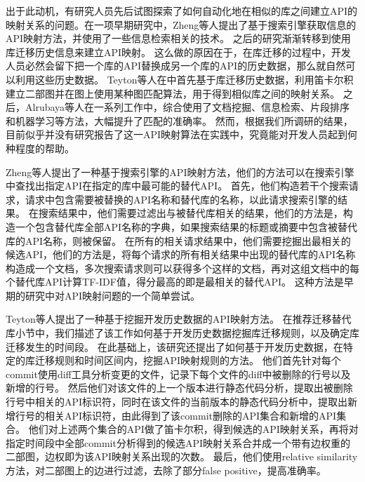 \documentclass[UTF8]{ctexart}
\begin{document}

出于此动机，有研究人员先后试图探索了如何自动化地在相似的库之间建立API的映射关系的问题\cite{2011FSE-Zheng-Cross, 2013WCRE-Teyton-Automatic, 2013ICSE-Gokhale-Inferring, 2019ICPC-Alrubaye-On, 2018CASCON-Alrubaye-Automating, 2019Arxiv-Alrubaye-Learning}。在一项早期研究中，Zheng等人\cite{2011FSE-Zheng-Cross}提出了基于搜索引擎获取信息的API映射方法，并使用了一些信息检索相关的技术。
之后的研究渐渐转移到使用库迁移历史信息来建立API映射。
这么做的原因在于，在库迁移的过程中，开发人员必然会留下把一个库的API替换成另一个库的API的历史数据，那么就自然可以利用这些历史数据。
Teyton等人在\cite{2013WCRE-Teyton-Automatic}中首先基于库迁移历史数据，利用笛卡尔积建立二部图并在图上使用某种图匹配算法\cite{2002ICDE-Melnik-Similarity}，用于得到相似库之间的映射关系。
之后，Alrubaya等人在一系列工作中\cite{2019ICPC-Alrubaye-On, 2018CASCON-Alrubaye-Automating, 2019Arxiv-Alrubaye-Learning}，综合使用了文档挖掘、信息检索、片段排序和机器学习等方法，大幅提升了匹配的准确率。
然而，根据我们所调研的结果，目前似乎并没有研究报告了这一API映射算法在实践中，究竟能对开发人员起到何种程度的帮助。


Zheng等人\cite{2011FSE-Zheng-Cross}提出了一种基于搜索引擎的API映射方法，他们的方法可以在搜索引擎中查找出指定API在指定的库中最可能的替代API。
首先，他们构造若干个搜索请求，请求中包含需要被替换的API名称和替代库的名称，以此请求搜索引擎的结果。
在搜索结果中，他们需要过滤出与被替代库相关的结果，他们的方法是，构造一个包含替代库全部API名称的字典，如果搜索结果的标题或摘要中包含被替代库的API名称，则被保留。
在所有的相关请求结果中，他们需要挖掘出最相关的候选API，他们的方法是，将每个请求的所有相关结果中出现的替代库的API名称构造成一个文档，多次搜索请求则可以获得多个这样的文档，再对这组文档中的每个替代库API计算TF-IDF值，得分最高的即是最相关的替代API。
这种方法是早期的研究中对API映射问题的一个简单尝试。

Teyton等人\cite{2013WCRE-Teyton-Automatic}提出了一种基于挖掘开发历史数据的API映射方法。
在推荐迁移替代库小节中，我们描述了该工作如何基于开发历史数据挖掘库迁移规则，以及确定库迁移发生的时间段。
在此基础上，该研究还提出了如何基于开发历史数据，在特定的库迁移规则和时间区间内，挖掘API映射规则的方法。
他们首先针对每个commit使用diff工具分析变更的文件，记录下每个文件的diff中被删除的行号以及新增的行号。
然后他们对该文件的上一个版本进行静态代码分析，提取出被删除行号中相关的API标识符，同时在该文件的当前版本的静态代码分析中，提取出新增行号的相关API标识符，由此得到了该commit删除的API集合和新增的API集合。
他们对上述两个集合的API做了笛卡尔积，得到候选的API映射关系，再将对指定时间段中全部commit分析得到的候选API映射关系合并成一个带有边权重的二部图，边权即为该API映射关系出现的次数。
最后，他们使用relative similarity\cite{2002ICDE-Melnik-Similarity}方法，对二部图上的边进行过滤，去除了部分false positive，提高准确率。
\end{document}
